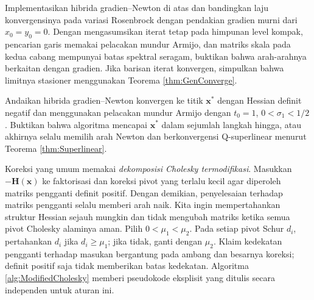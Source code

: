 \begin{exercise} Implementasikan hibrida gradien--Newton di atas dan bandingkan laju konvergensinya pada variasi Rosenbrock dengan pendakian gradien murni dari $x_0=y_0=0$. Dengan mengasumsikan iterat tetap pada himpunan level kompak, pencarian garis memakai pelacakan mundur Armijo, dan matriks skala pada kedua cabang mempunyai batas spektral seragam, buktikan bahwa arah-arahnya berkaitan dengan gradien. Jika barisan iterat konvergen, simpulkan bahwa limitnya stasioner menggunakan Teorema \ref{thm:GenConverge}.
\end{exercise}

\begin{exercise} Andaikan hibrida gradien--Newton konvergen ke titik $\mathbf{x}^*$ dengan Hessian definit negatif dan menggunakan pelacakan mundur Armijo dengan $t_0=1$, $0<\sigma_1<1/2$. Buktikan bahwa algoritma mencapai $\mathbf{x}^*$ dalam sejumlah langkah hingga, atau akhirnya selalu memilih arah Newton dan berkonvergensi Q-superlinear menurut Teorema \ref{thm:Superlinear}.
\end{exercise}

\begin{remark} Koreksi yang umum memakai \textit{dekomposisi Cholesky termodifikasi}. Masukkan $-\mathbf{H}(\mathbf{x})$ ke faktorisasi dan koreksi pivot yang terlalu kecil agar diperoleh matriks pengganti definit positif. Dengan demikian, penyelesaian terhadap matriks pengganti selalu memberi arah naik. Kita ingin mempertahankan struktur Hessian sejauh mungkin dan tidak mengubah matriks ketika semua pivot Cholesky alaminya aman. Pilih $0<\mu_1<\mu_2$. Pada setiap pivot Schur $d_i$, pertahankan $d_i$ jika $d_i\geq\mu_1$; jika tidak, ganti dengan $\mu_2$. Klaim kedekatan pengganti terhadap masukan bergantung pada ambang dan besarnya koreksi; definit positif saja tidak memberikan batas kedekatan. Algoritma \ref{alg:ModifiedCholesky} memberi pseudokode eksplisit yang ditulis secara independen untuk aturan ini.
\end{remark}

